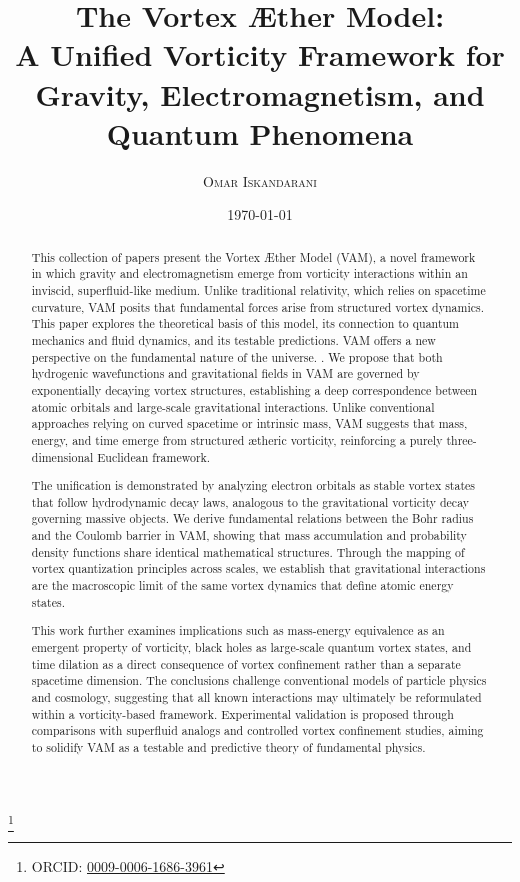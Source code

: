 \documentclass[12pt, a4paper, oneside]{scrreprt} %
\begin{document}
    \title{\Huge The Vortex Æther Model:  \\ \large A Unified Vorticity Framework for Gravity, Electromagnetism, and Quantum Phenomena}

    \author{\textsc{Omar Iskandarani}}
    \thanks{ORCID: \href{https://orcid.org/0009-0006-1686-3961}{0009-0006-1686-3961}}

    \date{\today}
\frontmatter
    \begin{abstract}
         This collection of papers present the Vortex Æther Model (VAM), a novel framework in which gravity and electromagnetism emerge from vorticity interactions within an inviscid, superfluid-like medium. Unlike traditional relativity, which relies on spacetime curvature, VAM posits that fundamental forces arise from structured vortex dynamics. This paper explores the theoretical basis of this model, its connection to quantum mechanics and fluid dynamics, and its testable predictions. VAM offers a new perspective on the fundamental nature of the universe. . We propose that both hydrogenic wavefunctions and gravitational fields in VAM are governed by exponentially decaying vortex structures, establishing a deep correspondence between atomic orbitals and large-scale gravitational interactions. Unlike conventional approaches relying on curved spacetime or intrinsic mass, VAM suggests that mass, energy, and time emerge from structured ætheric vorticity, reinforcing a purely three-dimensional Euclidean framework.

        The unification is demonstrated by analyzing electron orbitals as stable vortex states that follow hydrodynamic decay laws, analogous to the gravitational vorticity decay governing massive objects. We derive fundamental relations between the Bohr radius and the Coulomb barrier in VAM, showing that mass accumulation and probability density functions share identical mathematical structures. Through the mapping of vortex quantization principles across scales, we establish that gravitational interactions are the macroscopic limit of the same vortex dynamics that define atomic energy states.

        This work further examines implications such as mass-energy equivalence as an emergent property of vorticity, black holes as large-scale quantum vortex states, and time dilation as a direct consequence of vortex confinement rather than a separate spacetime dimension. The conclusions challenge conventional models of particle physics and cosmology, suggesting that all known interactions may ultimately be reformulated within a vorticity-based framework. Experimental validation is proposed through comparisons with superfluid analogs and controlled vortex confinement studies, aiming to solidify VAM as a testable and predictive theory of fundamental physics.
    \end{abstract}
    \tableofcontents
\end{document}
